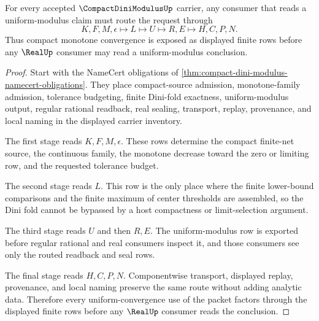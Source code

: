 \begin{theorem}
\label{thm:compact-dini-modulus-uniform-convergence-route}
For every accepted $\CompactDiniModulusUp$ carrier, any consumer that reads a uniform-modulus claim must route the request through
$$
K,F,M,\epsilon \longmapsto L \longmapsto U \longmapsto R,E \longmapsto H,C,P,N .
$$
Thus compact monotone convergence is exposed as displayed finite rows before any $\RealUp$ consumer may read a uniform-modulus conclusion.
\end{theorem}
\begin{proof}
Start with the NameCert obligations of \autoref{thm:compact-dini-modulus-namecert-obligations}. They place compact-source admission, monotone-family admission, tolerance budgeting, finite Dini-fold exactness, uniform-modulus output, regular rational readback, real sealing, transport, replay, provenance, and local naming in the displayed carrier inventory.

The first stage reads $K,F,M,\epsilon$. These rows determine the compact finite-net source, the continuous family, the monotone decrease toward the zero or limiting row, and the requested tolerance budget.

The second stage reads $L$. This row is the only place where the finite lower-bound comparisons and the finite maximum of center thresholds are assembled, so the Dini fold cannot be bypassed by a host compactness or limit-selection argument.

The third stage reads $U$ and then $R,E$. The uniform-modulus row is exported before regular rational and real consumers inspect it, and those consumers see only the routed readback and seal rows.

The final stage reads $H,C,P,N$. Componentwise transport, displayed replay, provenance, and local naming preserve the same route without adding analytic data. Therefore every uniform-convergence use of the packet factors through the displayed finite rows before any $\RealUp$ consumer reads the conclusion.
\end{proof}



